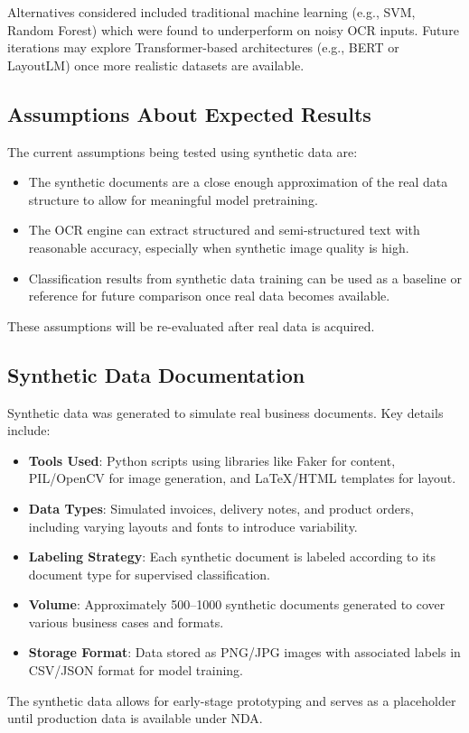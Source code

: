 Alternatives considered included traditional machine learning (e.g., SVM, Random Forest) which were found to underperform on noisy OCR inputs. Future iterations may explore Transformer-based architectures (e.g., BERT or LayoutLM) once more realistic datasets are available.

\subsection{Assumptions About Expected Results}

The current assumptions being tested using synthetic data are:

\begin{itemize}
  \item The synthetic documents are a close enough approximation of the real data structure to allow for meaningful model pretraining.
  \item The OCR engine can extract structured and semi-structured text with reasonable accuracy, especially when synthetic image quality is high.
  \item Classification results from synthetic data training can be used as a baseline or reference for future comparison once real data becomes available.
\end{itemize}

These assumptions will be re-evaluated after real data is acquired.

\subsection{Synthetic Data Documentation}

Synthetic data was generated to simulate real business documents. Key details include:

\begin{itemize}
  \item \textbf{Tools Used}: Python scripts using libraries like Faker for content, PIL/OpenCV for image generation, and LaTeX/HTML templates for layout.
  \item \textbf{Data Types}: Simulated invoices, delivery notes, and product orders, including varying layouts and fonts to introduce variability.
  \item \textbf{Labeling Strategy}: Each synthetic document is labeled according to its document type for supervised classification.
  \item \textbf{Volume}: Approximately 500–1000 synthetic documents generated to cover various business cases and formats.
  \item \textbf{Storage Format}: Data stored as PNG/JPG images with associated labels in CSV/JSON format for model training.
\end{itemize}

The synthetic data allows for early-stage prototyping and serves as a placeholder until production data is available under NDA.


